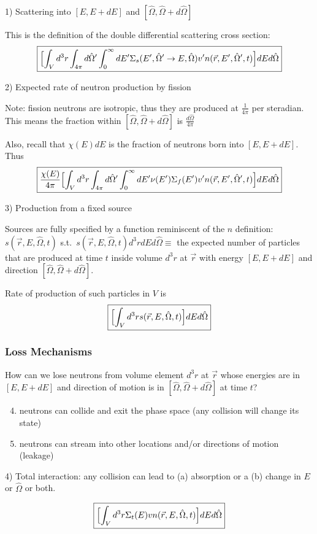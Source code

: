 \documentclass[12pt]{article}
\newcommand{\vOmega}{\ensuremath{\hat{\Omega}}}
\begin{document}
1) Scattering into $[E, E + dE]$ and $[\vOmega, \vOmega + d\vOmega]$

This is the definition of the double differential scattering cross section:
\[\boxed{\Bigl[\int_V d^3r \int_{4\pi} d\vOmega' \int_0^{\infty} dE' \Sigma_s(E', \vOmega' \rightarrow E, \vOmega) v' n(\vec{r}, E', \vOmega', t) \Bigr] dE d\vOmega}\]

2) Expected rate of neutron production by fission

Note: fission neutrons are isotropic, thus they are produced at $\frac{1}{4\pi}$ per steradian. This means the fraction within $[\vOmega, \vOmega + d\vOmega]$ is $\frac{d\vOmega}{4\pi}$

Also, recall that $\chi(E)dE$ is the fraction of neutrons born into $[E, E + dE]$. Thus
%
\[\boxed{\frac{\chi(E)}{4\pi}\Bigl[\int_V d^3r \int_{4\pi} d\vOmega' \int_0^{\infty} dE' \nu(E') \Sigma_f(E') v' n(\vec{r}, E', \vOmega', t) \Bigr] dE d\vOmega}\]

3) Production from a fixed source

Sources are fully specified by a function reminiscent of the $n$ definition: $s(\vec{r}, E, \vOmega, t)$ s.t.\ $s(\vec{r}, E, \vOmega, t)d^3rdEd\vOmega \equiv$ the expected number of particles that are produced at time $t$ inside volume $d^3r$ at $\vec{r}$ with energy $[E, E + dE]$ and direction $[\vOmega, \vOmega + d\vOmega]$.

Rate of production of such particles in $V$ is
\[\boxed{\Bigl[\int_V d^3r s(\vec{r}, E, \vOmega, t) \Bigr] dE d\vOmega }\]

\subsubsection{Loss Mechanisms}
How can we lose neutrons from volume element $d^3r$ at $\vec{r}$ whose energies are in $[E, E + dE]$ and direction of motion is in $[\vOmega, \vOmega + d\vOmega]$ at time $t$?
%
\begin{enumerate}
\setcounter{enumi}{3}
\item neutrons can collide and exit the phase space (any collision will change its state)
\item neutrons can stream into other locations and/or directions of motion (leakage)
\end{enumerate}

4) Total interaction: any collision can lead to (a) absorption or a (b) change in $E$ or $\vOmega$ or both.

\[\boxed{\Bigl[\int_V d^3r \Sigma_t(E) v n(\vec{r}, E, \vOmega, t) \Bigr] dE d\vOmega }\]
\end{document}
